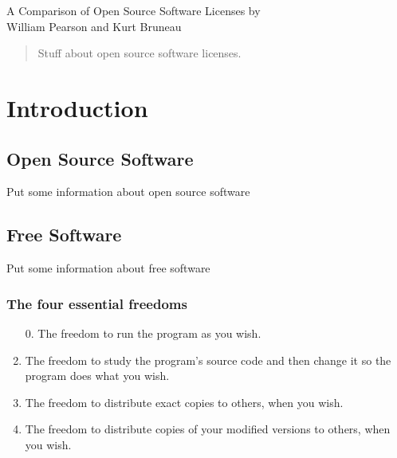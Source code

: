\documentclass[12pt,letterpaper]{article}
\begin{document}
\thispagestyle{empty}

\begin{titlepage}
\vspace*{1.5in}
\begin{center}
  \huge A Comparison of Open Source Software Licenses
  \vskip1.5in
  \large by \\
  \large William Pearson and Kurt Bruneau \\
\end{center}
\end{titlepage}


\tableofcontents
\listoffigures
\newpage

\begin{abstract}
Stuff about open source software licenses.
\end{abstract}
\newpage
\thispagestyle{empty}
\setcounter{page}{1}

\section{Introduction}

\subsection{Open Source Software}
Put some information about open source software

\subsection{Free Software}

Put some information about free software

\subsubsection{The four essential freedoms}
\begin{enumerate}
\item[0.] The freedom to run the program as you wish.
\item The freedom to study the program's source code and then change it so the program does what you wish.
\item The freedom to distribute exact copies to others, when you wish.
\item The freedom to distribute copies of your modified versions to others, when you wish.
\end{enumerate}
\end{document}

